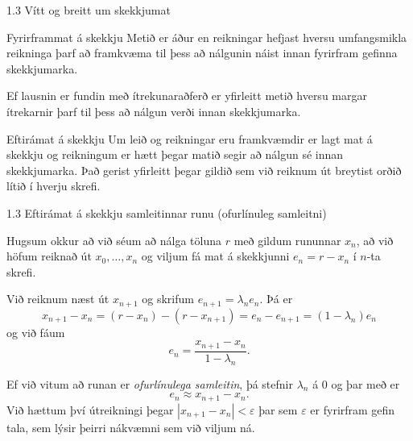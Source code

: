 \begin{frame}{1.3 Vítt og breitt um skekkjumat } 
\begin{block}{Fyrirframmat á skekkju} 
Metið er áður en reikningar hefjast hversu umfangsmikla reikninga þarf 
að framkvæma til þess að nálgunin náist innan fyrirfram gefinna
skekkjumarka.

\medskip
Ef lausnin er fundin með ítrekunaraðferð er yfirleitt metið hversu
margar ítrekarnir þarf til þess að nálgun verði innan skekkjumarka.
\end{block}

\pause

\begin{block}{Eftirámat á skekkju}   Um leið og reikningar eru
framkvæmdir er lagt mat á skekkju og reikningum er hætt þegar matið
segir að nálgun sé innan skekkjumarka. Það gerist yfirleitt þegar 
gildið sem við reiknum út breytist orðið lítið í hverju skrefi.
\end{block}
\end{frame}
%
%
\begin{frame}{1.3 Eftirámat á skekkju samleitinnar runu (ofurlínuleg samleitni)} 

Hugsum okkur að við séum að nálga töluna $r$ með gildum rununnar
$x_n$, að við höfum reiknað út $x_0,\dots,x_n$ 
og viljum fá mat á skekkjunni $e_n=r-x_n$ í $n$-ta skrefi. 

\smallskip
Við reiknum næst út $x_{n+1}$ og skrifum $e_{n+1}=\lambda_ne_n$.  Þá er 
\begin{equation*}
    x_{n+1}-x_n = (r-x_n)-(r-x_{n+1})
    = e_n-e_{n+1} = (1-\lambda_n)e_n
\end{equation*}
og við fáum 
\begin{equation*}
    e_n = \dfrac{x_{n+1}-x_n}{1-\lambda_n}.
\end{equation*}

Ef við vitum að runan er {\it ofurlínulega samleitin}, þá stefnir 
$\lambda_n$ á $0$ og þar með er 
\begin{equation*}
    e_n\approx x_{n+1}-x_n. 
\end{equation*}
Við hættum því útreikningi þegar $|x_{n+1}-x_n|<\varepsilon$
þar sem $\varepsilon$ er fyrirfram gefin tala, sem lýsir þeirri
nákvæmni sem við viljum ná.  
\end{frame}
%

